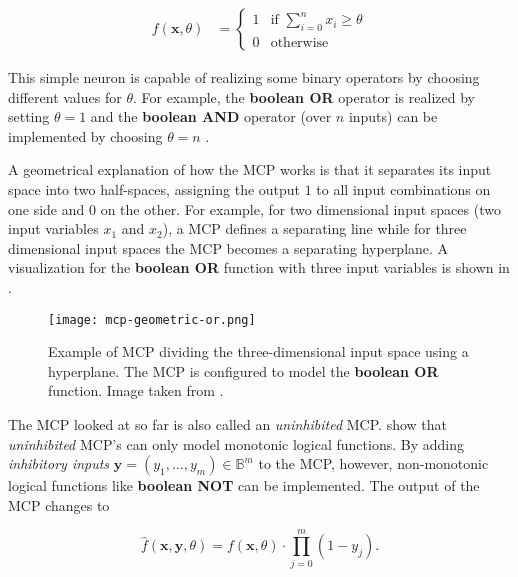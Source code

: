 \begin{equation}
    \begin{split}
        \label{eq:mcculloch-binary}
        f(\bm{x}, \theta)
        &=
        \begin{cases}
            1 & \text{if } \sum_{i=0}^n x_i \geq \theta \\
            0 & \text{otherwise}
        \end{cases}
    \end{split}
\end{equation}

This simple neuron is capable of realizing some binary operators by choosing different values for $\theta$.
For example, the \textbf{boolean OR} operator is realized by setting $\theta = 1$ and the \textbf{boolean AND} operator (over $n$ inputs) can be implemented by choosing $\theta = n$ \cite{rojas_neural_1996}.

A geometrical explanation of how the MCP works is that it separates its input space into two half-spaces, assigning the output $1$ to all input combinations on one side and $0$ on the other.
For example, for two dimensional input spaces (two input variables $x_1$ and $x_2$), a MCP defines a separating line while for three dimensional input spaces the MCP becomes a separating hyperplane.
A visualization for the \textbf{boolean OR} function with three input variables is shown in .

\begin{figure}[htb!]
    \centering
    \texttt{[image: mcp-geometric-or.png]}
    \caption{Example of MCP dividing the three-dimensional input space using a hyperplane. The MCP is configured to model the \textbf{boolean OR} function. Image taken from \cite{rojas_neural_1996}.}
    \label{fig:mcp-geometric-or}
\end{figure}

The MCP looked at so far is also called an \textit{uninhibited} MCP.
\cite{rojas_neural_1996} show that \textit{uninhibited} MCP's can only model monotonic logical functions.
By adding \textit{inhibitory inputs} $\bm{y} = (y_1, \dots, y_m) \in \mathbb{B}^m$ to the MCP, however, non-monotonic logical functions like \textbf{boolean NOT} can be implemented.
The output of the MCP changes to

\begin{equation}
    \hat{f}(\bm{x}, \bm{y}, \theta) = f(\bm{x}, \theta) \cdot \prod_{j = 0}^m (1 - y_j).
\end{equation}


